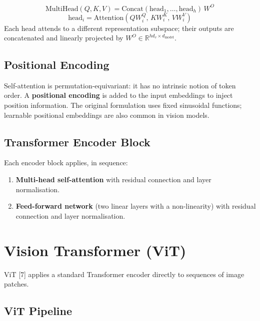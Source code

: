 \documentclass[12pt,a4paper]{report}
\begin{document}
\begin{formulabox}
\[
    \mathrm{MultiHead}(Q,K,V)
    = \mathrm{Concat}(\mathrm{head}_1,\dots,\mathrm{head}_h)\,W^O
\]
\[
    \mathrm{head}_i
    = \mathrm{Attention}(QW_i^Q,\, KW_i^K,\, VW_i^V)
\]
Each head attends to a different representation subspace; their outputs are
concatenated and linearly projected by $W^O \in \mathbb{R}^{hd_v\times d_\text{model}}$.
\end{formulabox}

\subsection{Positional Encoding}

Self-attention is permutation-equivariant: it has no intrinsic notion of
token order.  A \textbf{positional encoding} is added to the input embeddings
to inject position information.  The original formulation uses fixed sinusoidal
functions; learnable positional embeddings are also common in vision models.

\subsection{Transformer Encoder Block}

Each encoder block applies, in sequence:
\begin{enumerate}[itemsep=1pt]
    \item \textbf{Multi-head self-attention} with residual connection and
          layer normalisation.
    \item \textbf{Feed-forward network} (two linear layers with a non-linearity)
          with residual connection and layer normalisation.
\end{enumerate}

\section{Vision Transformer (ViT)}

ViT [7] applies a standard Transformer encoder directly
to sequences of image patches.

\subsection{ViT Pipeline}
\end{document}
